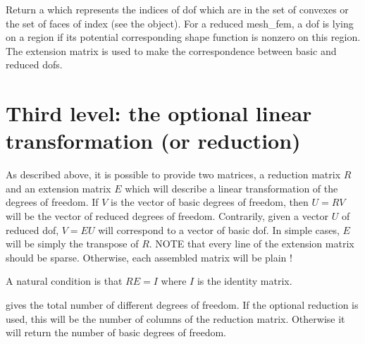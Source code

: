 \documentclass[a4paper,11pt,english]{sphinxmanual}
\begin{document}

\begin{fulllineitems}
\label{\detokenize{userdoc/bfem:_CPPv4N6getfem8mesh_fem13dof_on_regionE1i}}%
\pysigstartmultiline
{}%
\pysigstopmultiline
Return a  which represents the indices of dof which are in the set of
convexes or the set of faces of index  (see the  object). For a
reduced mesh\_fem, a dof is lying on a region if its potential corresponding
shape function is nonzero on this region. The extension matrix is used to make
the correspondence between basic and reduced dofs.

\end{fulllineitems}



\section{Third level: the optional linear transformation (or reduction)}
\label{\detokenize{userdoc/bfem:third-level-the-optional-linear-transformation-or-reduction}}
As described above, it is possible to provide two matrices, a reduction matrix
\(R\) and an extension matrix \(E\) which will describe a linear
transformation of the degrees of freedom. If \(V\) is the vector of basic
degrees of freedom, then \(U=RV\) will be the vector of reduced degrees of
freedom. Contrarily, given a vector \(U\) of reduced dof, \(V=EU\) will
correspond to a vector of basic dof. In simple cases, \(E\) will be simply the
transpose of \(R\). NOTE that every line of the extension matrix should be
sparse. Otherwise, each assembled matrix will be plain !

A natural condition is that \(RE = I\) where \(I\) is the identity matrix.

\begin{fulllineitems}
\label{\detokenize{userdoc/bfem:_CPPv4N6getfem8mesh_fem6nb_dofEv}}%
\pysigstartmultiline
{}%
\pysigstopmultiline
gives the total number of different degrees of freedom. If the optional
reduction is used, this will be the number of columns of the reduction matrix.
Otherwise it will return the number of basic degrees of freedom.

\end{fulllineitems}
\end{document}
